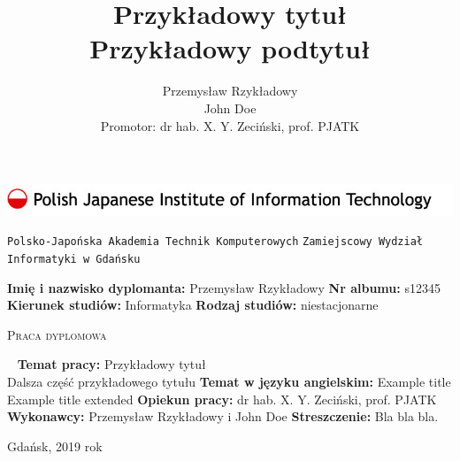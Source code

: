 \documentclass[11pt,twoside,a4paper,titlepage,onecolumn]{book}
\author{Przemysław Rzykładowy\\John Doe\\Promotor: dr hab. X. Y. Zeciński, prof. PJATK}
\title{
    Przykładowy tytuł\\
    \large
    Przykładowy podtytuł
}
\begin{document}
\begin{titlepage}                                                                                        
	\includegraphics[width=\textwidth]{pjwstk_logo}
	\begin{center}
		{\huge\texttt{Polsko-Japońska Akademia Technik Komputerowych}}
		{\huge\texttt{Zamiejscowy Wydział Informatyki w Gdańsku}}
	\end{center}
	\vspace{1cm}
	{\Large\textbf{Imię i nazwisko dyplomanta:} Przemysław Rzykładowy}
	\vspace{0.5cm}
	\newline
	{\Large\textbf{Nr albumu:} s12345}
	\vspace{0.5cm}
	\newline
	{\Large\textbf{Kierunek studiów:}
	Informatyka \hfill \textbf{Rodzaj studiów:} niestacjonarne}

	\vspace{1.5cm}
	\begin{center}
	{\huge\textsc{Praca dyplomowa}}
	\end{center}
	\vspace{1cm}

	~
	\newline
	{\Large
	\textbf{Temat pracy:} Przykładowy tytuł\\
	 Dalsza część przykładowego tytułu}
	\vspace{1cm}
	\newline
	{\Large\textbf{Temat w języku angielskim:} Example title\\
	 Example title extended}
	\vspace{1cm}
	\newline
	{\Large\textbf{Opiekun pracy:} dr hab. X. Y. Zeciński, prof. PJATK}
	\vspace{0.5cm}
	\newline
	{\Large\textbf{Wykonawcy:} Przemysław Rzykładowy i John Doe}
	\vspace{1.5cm}
	\newline
	{\Large\textbf{Streszczenie:} Bla bla bla.}
	\vspace*{\fill}
	\begin{center}
	Gdańsk, 2019 rok
	\end{center}
\end{titlepage}
\end{document}
